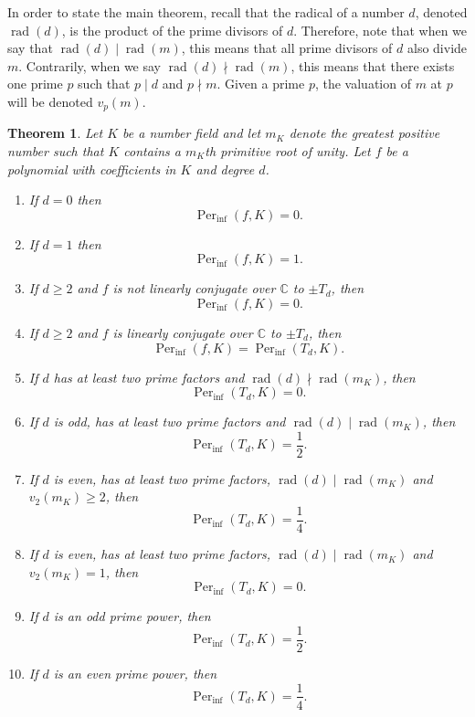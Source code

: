 \documentclass{amsart}
\def\CC{\mathbb C}
\DeclareMathOperator{\Per}{Per}
\DeclareMathOperator{\rad}{rad}
\newtheorem{Theorem}{Theorem}
\theoremstyle{definition}
\begin{document}
In order to state the main theorem, recall that the radical of a number $d$, denoted $\rad(d)$, is the product of the prime divisors of $d$. Therefore, note that when we say that $\rad(d) \mid \rad(m)$, this means that all prime divisors of $d$ also divide $m$. Contrarily, when we say $\rad(d) \nmid \rad(m)$, this means that there exists one prime $p$ such that $p \mid d$ and $p \nmid m$. Given a prime $p$, the valuation of $m$ at $p$ will be denoted $v_p(m)$.

\begin{Theorem}
Let $K$ be a number field and let $m_K$ denote the greatest positive number such that $K$ contains a $m_K$th primitive root of unity. Let $f$ be a polynomial with coefficients in $K$ and degree $d$.

\begin{enumerate}
\item If $d = 0$ then $$\Per_{\inf}(f,K) = 0.$$

\item If $d = 1$ then $$\Per_{\inf}(f,K) = 1.$$

\item If $d \geq 2$ and $f$ is not linearly conjugate over $\CC$ to $\pm T_d$, then $$\Per_{\inf}(f,K) = 0.$$

\item If $d \geq 2$ and $f$ is linearly conjugate over $\CC$ to $\pm T_d$, then $$\Per_{\inf}(f,K) = \Per_{\inf}(T_d,K).$$

\item If $d$ has at least two prime factors and $\rad(d) \nmid \rad(m_K)$, then $$\Per_{\inf}(T_d,K) = 0.$$

\item If $d$ is odd, has at least two prime factors and $\rad(d) \mid \rad(m_K)$, then $$\Per_{\inf}(T_d,K) = \frac{1}{2}.$$  

\item If $d$ is even, has at least two prime factors, $\rad(d) \mid \rad(m_K)$ and $v_2(m_K) \geq 2$, then $$\Per_{\inf}(T_d,K) = \frac{1}{4}.$$

\item If $d$ is even, has at least two prime factors, $\rad(d) \mid \rad(m_K)$ and $v_2(m_K) = 1$, then $$\Per_{\inf}(T_d,K) = 0.$$

\item If $d$ is an odd prime power, then $$\Per_{\inf}(T_d,K) = \frac{1}{2}.$$ 

\item If $d$ is an even prime power, then $$\Per_{\inf}(T_d,K) = \frac{1}{4}.$$ 
\end{enumerate}
\label{Theorem: main result clasification}
\end{Theorem}
\end{document}
